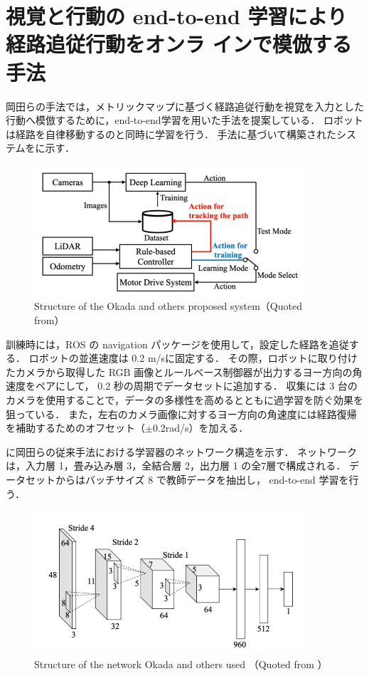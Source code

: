 \section{視覚と行動の end-to-end 学習により経路追従行動をオンラ
インで模倣する手法}
岡田らの手法では，メトリックマップに基づく経路追従行動を視覚を入力とした行動へ模倣するために，end-to-end学習を用いた手法を提案している．
ロボットは経路を自律移動するのと同時に学習を行う．
手法に基づいて構築されたシステムをに示す．

\begin{figure}[htbp]
  \centering
   \includegraphics[width=100mm]{images/pdf/okada/method_sys.pdf}
   \caption[Structure of the Okada and others proposed system]{Structure of the Okada and others proposed system（Quoted from\cite{okada2020}）}
   \label{fig:okada_sys}
\end{figure}

訓練時には，ROS の navigation パッケージを使用して，設定した経路を追従する．
ロボットの並進速度は 0.2 m/sに固定する．
その際，ロボットに取り付けたカメラから取得した RGB 画像とルールベース制御器が出力するヨー方向の角速度をペアにして， 0.2 秒の周期でデータセットに追加する．
収集には 3 台のカメラを使用することで，データの多様性を高めるとともに過学習を防ぐ効果を狙っている．
また，左右のカメラ画像に対するヨー方向の角速度には経路復帰を補助するためのオフセット（\(\pm 0.2\)rad/s）を加える．

\newpage
{}に岡田らの従来手法における学習器のネットワーク構造を示す．
ネットワークは，入力層 1，畳み込み層 3，全結合層 2，出力層 1 の全7層で構成される．
データセットからはバッチサイズ 8 で教師データを抽出し， end-to-end 学習を行う．

\begin{figure}[htbp]
    \centering
     \includegraphics[width=100mm]{images/pdf/okada/network.pdf}
     \caption{Structure of the network Okada and others used （Quoted from \cite{okada2020}）}
     \label{fig:okada_net}
\end{figure}

